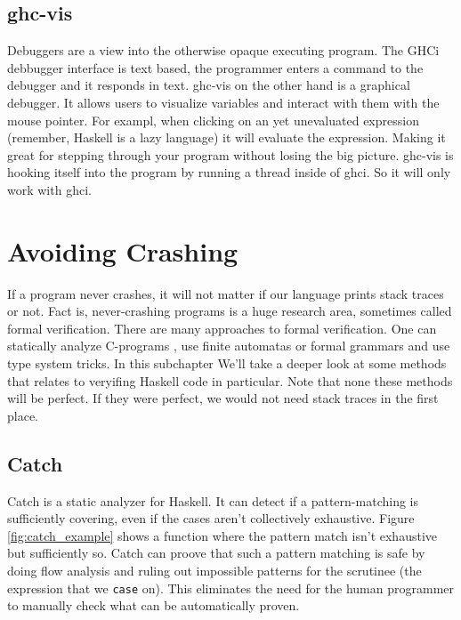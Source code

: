 \subsection{ghc-vis}

Debuggers are a view into the otherwise opaque executing program. The
GHCi debbugger interface is text based, the programmer enters a command
to the debugger and it responds in text.  ghc-vis on the other hand is a
graphical debugger.  It allows users to visualize variables and interact
with them with the mouse pointer. For exampl, when clicking on an yet
unevaluated expression (remember, Haskell is a lazy language) it will
evaluate the expression.  Making it great for stepping through your
program without losing the big picture.  ghc-vis is hooking itself into
the program by running a thread inside of ghci. So it will only work
with ghci.  \cite{thesisFelsingBA}


\section{Avoiding Crashing}

If a program never crashes,
it will not matter if our language prints stack traces or not. Fact is,
never-crashing programs is a huge research area, sometimes called formal
verification. There are many approaches to formal verification. One
can statically analyze C-programs \cite{ckl2004},   %
use finite automatas %
or formal grammars \cite{dantam2013motion} %
and use type system tricks. %
In this subchapter We'll take a deeper look at some methods that
relates to veryifing Haskell code in particular. Note that none
these methods will be perfect. If they were perfect, we would not need
stack traces in the first place.

\subsection{Catch}

Catch is a static analyzer for Haskell. It can detect if a pattern-matching is
sufficiently covering, even if the cases aren't collectively exhaustive. Figure
\ref{fig:catch_example} shows a function where the pattern match isn't exhaustive but
sufficiently so.
Catch can proove that such a pattern
matching is safe by doing flow analysis and ruling out impossible
patterns for the scrutinee (the expression that we \texttt{case} on). %
This eliminates the need for the human programmer to manually check what can be
automatically proven. \cite{mitchell:catch_2008_9_25}

